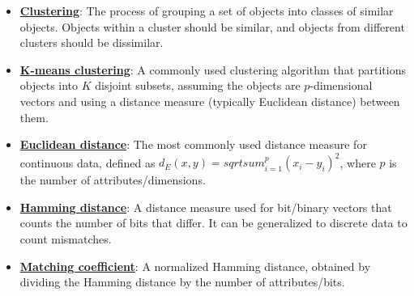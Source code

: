 \documentclass{article}%
\begin{document}
\begin{itemize}[leftmargin=*]%
\item \href{https://purdue.brightspace.com/d2l/common/assets/pdfjs-d2l-dist/1.0.14-legacy/web/viewer.html?file=\%2Fcontent\%2Fenforced\%2F1095467-wl.202510.CS.24300.001\%2F12L2-distance-clusters.pdf\%3Fou\%3D1095467\&lang=en-us\&container=d2l-fileviewer-rendered-pdf\&fullscreen=d2l-fileviewer-rendered-pdf-dialog\&height=667#page=4}{\textbf{Clustering}}: The process of grouping a set of objects into classes of similar objects. Objects within a cluster should be similar, and objects from different clusters should be dissimilar.%
\item \href{https://purdue.brightspace.com/d2l/common/assets/pdfjs-d2l-dist/1.0.14-legacy/web/viewer.html?file=\%2Fcontent\%2Fenforced\%2F1095467-wl.202510.CS.24300.001\%2F12L2-distance-clusters.pdf\%3Fou\%3D1095467\&lang=en-us\&container=d2l-fileviewer-rendered-pdf\&fullscreen=d2l-fileviewer-rendered-pdf-dialog\&height=667#page=21}{\textbf{K{-}means clustering}}: A commonly used clustering algorithm that partitions objects into $K$ disjoint subsets, assuming the objects are $p$-dimensional vectors and using a distance measure (typically Euclidean distance) between them.%
\item \href{https://purdue.brightspace.com/d2l/common/assets/pdfjs-d2l-dist/1.0.14-legacy/web/viewer.html?file=\%2Fcontent\%2Fenforced\%2F1095467-wl.202510.CS.24300.001\%2F12L2-distance-clusters.pdf\%3Fou\%3D1095467\&lang=en-us\&container=d2l-fileviewer-rendered-pdf\&fullscreen=d2l-fileviewer-rendered-pdf-dialog\&height=667#page=17}{\textbf{Euclidean distance}}: The most commonly used distance measure for continuous data, defined as $d_E(x, y) =  sqrt{ sum_{i=1}^{p} (x_i - y_i)^2}$, where $p$ is the number of attributes/dimensions.%
\item \href{https://purdue.brightspace.com/d2l/common/assets/pdfjs-d2l-dist/1.0.14-legacy/web/viewer.html?file=\%2Fcontent\%2Fenforced\%2F1095467-wl.202510.CS.24300.001\%2F12L2-distance-clusters.pdf\%3Fou\%3D1095467\&lang=en-us\&container=d2l-fileviewer-rendered-pdf\&fullscreen=d2l-fileviewer-rendered-pdf-dialog\&height=667#page=19}{\textbf{Hamming distance}}: A distance measure used for bit/binary vectors that counts the number of bits that differ. It can be generalized to discrete data to count mismatches.%
\item \href{https://purdue.brightspace.com/d2l/common/assets/pdfjs-d2l-dist/1.0.14-legacy/web/viewer.html?file=\%2Fcontent\%2Fenforced\%2F1095467-wl.202510.CS.24300.001\%2F12L2-distance-clusters.pdf\%3Fou\%3D1095467\&lang=en-us\&container=d2l-fileviewer-rendered-pdf\&fullscreen=d2l-fileviewer-rendered-pdf-dialog\&height=667#page=19}{\textbf{Matching coefficient}}: A normalized Hamming distance, obtained by dividing the Hamming distance by the number of attributes/bits.%

\end{itemize}
\end{document}
